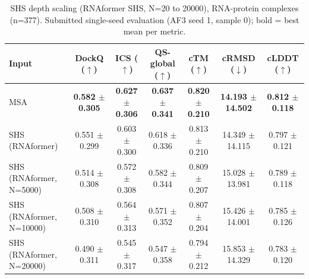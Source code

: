 \begin{table}[htbp]
\centering
\caption{SHS depth scaling (RNAformer SHS, N=20 to 20000), RNA-protein complexes (n=377). Submitted single-seed evaluation (AF3 seed 1, sample 0); bold = best mean per metric.}
\label{tab:rna_protein_complexes_scaling}
\begin{tabular}{lcccccc}
\toprule
Input & DockQ ($\uparrow$) & ICS ($\uparrow$) & QS-global ($\uparrow$) & cTM ($\uparrow$) & cRMSD ($\downarrow$) & cLDDT ($\uparrow$) \\
\midrule
MSA & \textbf{0.582 $\pm$ 0.305} & \textbf{0.627 $\pm$ 0.306} & \textbf{0.637 $\pm$ 0.341} & \textbf{0.820 $\pm$ 0.210} & \textbf{14.193 $\pm$ 14.502} & \textbf{0.812 $\pm$ 0.118} \\
SHS (RNAformer) & 0.551 $\pm$ 0.299 & 0.603 $\pm$ 0.300 & 0.618 $\pm$ 0.336 & 0.813 $\pm$ 0.210 & 14.349 $\pm$ 14.115 & 0.797 $\pm$ 0.121 \\
SHS (RNAformer, N=5000) & 0.514 $\pm$ 0.308 & 0.572 $\pm$ 0.308 & 0.582 $\pm$ 0.344 & 0.809 $\pm$ 0.207 & 15.028 $\pm$ 13.981 & 0.789 $\pm$ 0.118 \\
SHS (RNAformer, N=10000) & 0.508 $\pm$ 0.310 & 0.564 $\pm$ 0.313 & 0.571 $\pm$ 0.352 & 0.807 $\pm$ 0.204 & 15.426 $\pm$ 14.001 & 0.785 $\pm$ 0.126 \\
SHS (RNAformer, N=20000) & 0.490 $\pm$ 0.311 & 0.545 $\pm$ 0.317 & 0.547 $\pm$ 0.358 & 0.794 $\pm$ 0.212 & 15.853 $\pm$ 14.329 & 0.783 $\pm$ 0.120 \\
\bottomrule
\end{tabular}
\end{table}
